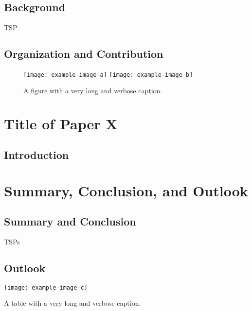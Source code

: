 \documentclass[paper=A4,
BCOR=10mm, %
DIV=12, %
fontsize=11pt,
twoside=true,
open=right,
headsepline, %
listof=totoc,
headings=normal, %
footinclude=false, %
headinclude=true %
]{scrbook}
\begin{document}
\section{Background}
\gls{TSP}
\lipsum[5]
\section{Organization and Contribution}
\lipsum[5] \citep{texbook}
\begin{figure}[htb]
  \texttt{[image: example-image-a]}\hfill
  \texttt{[image: example-image-b]}
  \caption[A short caption in the TOC.]{A figure with a very long and verbose caption.}
\end{figure}
\lipsum[5]

\sloppy
\printbibliography[segment=\therefsegment,heading=subbibnumbered]
\fussy

\chapter{Title of Paper X}
\begin{Abstract}
  \lipsum[5]
\end{Abstract}
\section{Introduction}
\lipsum[5]\citep{latex2e}

\sloppy
\printbibliography[segment=\therefsegment,heading=subbibnumbered]
\fussy

\chapter{Summary, Conclusion, and Outlook}
\section{Summary and Conclusion}
\glspl{TSP}
\lipsum[2]\citep{knuth:1984}
\section{Outlook}
\begin{table}[htb]
  \centering
  \texttt{[image: example-image-c]}
  \caption[A short caption in the TOC.]{A table with a very long and verbose caption.}
\end{table}

\sloppy
\printbibliography[segment=\therefsegment,heading=subbibnumbered]
\fussy

\sloppy
\printbibliography[heading=bibnumbered]
\fussy
\end{document}
